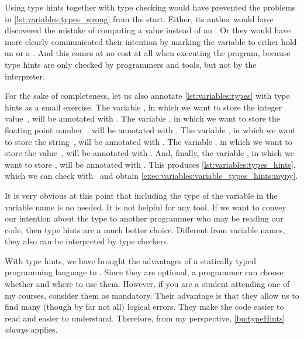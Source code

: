 Using type hints together with type checking would have prevented the problems in \cref{lst:variables:types_wrong} from the start.
Either, its author would have discovered the mistake of computing a  value instead of an .
Or they would have more clearly communicated their intention by marking the variable to either hold an  or a .
And this comes at no cost at all when executing the program, because type hints are only checked by programmers and tools, but not by the interpreter.
%
%
%
%
%

For the sake of completeness, let us also annotate \cref{lst:variables:types} with type hints as a small exercise.
The variable , in which we want to store the integer value~, will be annotated with .
The variable , in which we want to store the floating point number~, will be annotated with .
The variable , in which we want to store the string~, will be annotated with .
The variable , in which we want to store the value~, will be annotated with .
And, finally, the variable , in which we want to store , will be annotated with .
This produces \cref{lst:variables:types_hints}, which we can check with \mypy\ and obtain \cref{exec:variables:variable_types_hints:mypy}.

It is very obvious at this point that including the type of the variable in the variable name is no needed.
It is not helpful for any tool.
If we want to convey our intention about the type to another programmer who may be reading our code, then type hints are a much better choice.
Different from variable names, they also can be interpreted by type checkers.

With type hints, we have brought the advantages of a statically typed programming language to \python.
Since they are optional, a programmer can choose whether and where to use them.
However, if you are a student attending one of my courses, consider them as mandatory.
Their advantage is that they allow us to find many (though by far not all) logical errors.
They make the code easier to read and easier to understand.
Therefore, from my perspective, \cref{bp:typeHints} \emph{always} applies.%
%
\FloatBarrier%
\endhsection%
%
\endhsection%
%
